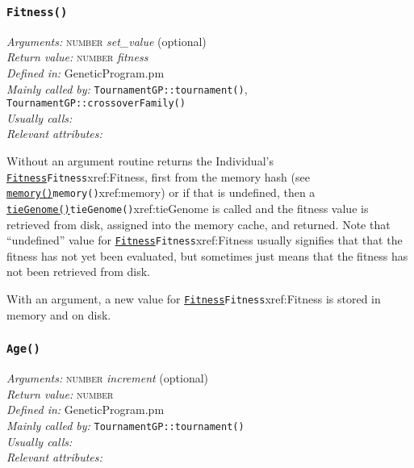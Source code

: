 \documentclass[a4paper]{article}
\begin{document}
\subsubsection{\texttt{Fitness()}}\label{xref:Fitness}
\begin{flushleft}
\textit{Arguments:} \textsc{number} \textit{set\_value} (optional)\\
\textit{Return value:} \textsc{number} \textit{fitness}\\
\textit{Defined in:} GeneticProgram.pm\\
\textit{Mainly called by:} \texttt{TournamentGP::tournament()}, \texttt{TournamentGP::crossoverFamily()}\\
\textit{Usually calls:} \\
\textit{Relevant attributes:}
\end{flushleft}

Without an argument routine returns the Individual's \hyperref[no]{\texttt{Fitness}}{\texttt{Fitness}}{xref:Fitness},
first from the memory hash (see \hyperref[no]{\texttt{memory()}}{\texttt{memory()}}{xref:memory}) or if that is
undefined, then a \hyperref[no]{\texttt{tieGenome()}}{\texttt{tieGenome()}}{xref:tieGenome} is called and the fitness value
is retrieved from disk, assigned into the memory cache, and returned.
Note that ``undefined'' value for \hyperref[no]{\texttt{Fitness}}{\texttt{Fitness}}{xref:Fitness} usually signifies
that that the fitness has not yet been evaluated, but sometimes just
means that the fitness has not been retrieved from disk.

With an argument, a new value for \hyperref[no]{\texttt{Fitness}}{\texttt{Fitness}}{xref:Fitness} is stored in memory
and on disk.

\subsubsection{\texttt{Age()}}\label{xref:Age}
\begin{flushleft}
\textit{Arguments:} \textsc{number} \textit{increment} (optional)\\
\textit{Return value:} \textsc{number}\\
\textit{Defined in:} GeneticProgram.pm\\
\textit{Mainly called by:} \texttt{TournamentGP::tournament()}\\
\textit{Usually calls:} \\
\textit{Relevant attributes:}
\end{flushleft}
\end{document}
